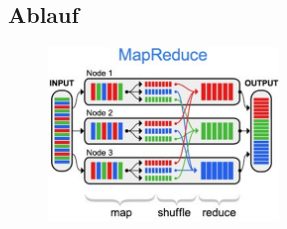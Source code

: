 \documentclass[a4paper,12pt]{article}
\begin{document}
\subsection{Ablauf}

\begin{figure}[h]
    \centering
    \includegraphics[width=6.1cm]{mapreduce.png}
\end{figure}
\end{document}
